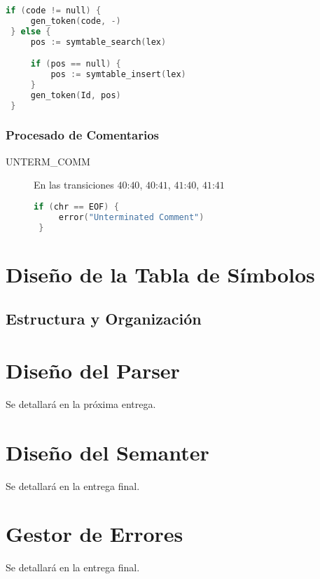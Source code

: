 \documentclass[a4paper]{CSMakotoTechnicalReport}
\begin{document}
\begin{minipage}{\textwidth}
\begin{multicols}{2}
\begin{description}
\begin{lstlisting}[language=C]
 if (code != null) {
     gen_token(code, -)
 } else {
     pos := symtable_search(lex)

     if (pos == null) {
         pos := symtable_insert(lex)
     }
     gen_token(Id, pos)
 }
            \end{lstlisting}

    \end{description}
    \end{multicols}

    \subsubsection{Procesado de Comentarios}

    \begin{description}
        \item[UNTERM\_COMM] En las transiciones $40$:$40$, $40$:$41$, $41$:$40$, $41$:$41$
            \begin{lstlisting}[language=C]
 if (chr == EOF) {
     error("Unterminated Comment")
 }
            \end{lstlisting}
    \end{description}
    \end{minipage}

    \section{Diseño de la Tabla de Símbolos}
    \subsection{Estructura y Organización}

    \section{Diseño del Parser}
    Se detallará en la próxima entrega.

    \section{Diseño del Semanter}
    Se detallará en la entrega final.

    \section{Gestor de Errores}
    Se detallará en la entrega final.

\end{document}
